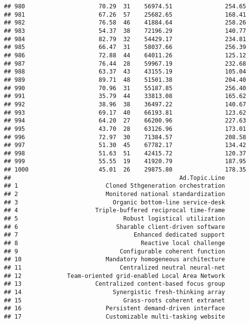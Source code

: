 \documentclass[
]{article}
\begin{document}
\begin{verbatim}
## 980                     70.29  31    56974.51               254.65
## 981                     67.26  57    25682.65               168.41
## 982                     76.58  46    41884.64               258.26
## 983                     54.37  38    72196.29               140.77
## 984                     82.79  32    54429.17               234.81
## 985                     66.47  31    58037.66               256.39
## 986                     72.88  44    64011.26               125.12
## 987                     76.44  28    59967.19               232.68
## 988                     63.37  43    43155.19               105.04
## 989                     89.71  48    51501.38               204.40
## 990                     70.96  31    55187.85               256.40
## 991                     35.79  44    33813.08               165.62
## 992                     38.96  38    36497.22               140.67
## 993                     69.17  40    66193.81               123.62
## 994                     64.20  27    66200.96               227.63
## 995                     43.70  28    63126.96               173.01
## 996                     72.97  30    71384.57               208.58
## 997                     51.30  45    67782.17               134.42
## 998                     51.63  51    42415.72               120.37
## 999                     55.55  19    41920.79               187.95
## 1000                    45.01  26    29875.80               178.35
##                                                Ad.Topic.Line
## 1                         Cloned 5thgeneration orchestration
## 2                         Monitored national standardization
## 3                           Organic bottom-line service-desk
## 4                      Triple-buffered reciprocal time-frame
## 5                              Robust logistical utilization
## 6                            Sharable client-driven software
## 7                                 Enhanced dedicated support
## 8                                   Reactive local challenge
## 9                             Configurable coherent function
## 10                        Mandatory homogeneous architecture
## 11                            Centralized neutral neural-net
## 12             Team-oriented grid-enabled Local Area Network
## 13                     Centralized content-based focus group
## 14                          Synergistic fresh-thinking array
## 15                             Grass-roots coherent extranet
## 16                        Persistent demand-driven interface
## 17                        Customizable multi-tasking website

\end{verbatim}
\end{document}
